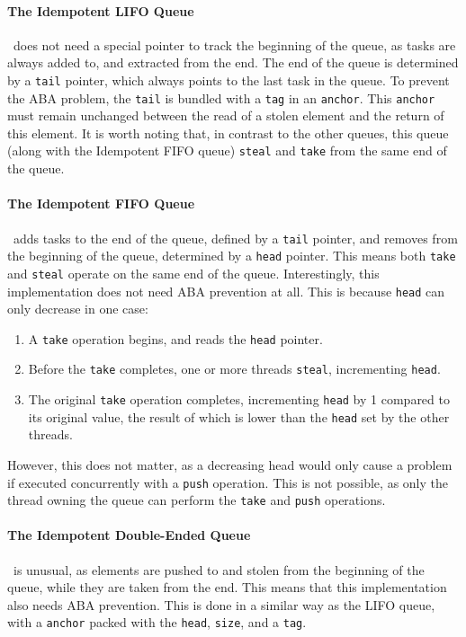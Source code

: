 \paragraph{The Idempotent LIFO Queue}\,\cite{Michael:2009:IWS:1594835.1504186} does not need a special pointer to track the beginning of the queue, as tasks are always added to, and extracted from the end.
The end of the queue is determined by a \texttt{tail} pointer, which always points to the last task in the queue.
To prevent the ABA problem, the \texttt{tail} is bundled with a \texttt{tag} in an \texttt{anchor}.
This \texttt{anchor} must remain unchanged between the read of a stolen element and the return of this element.
It is worth noting that, in contrast to the other queues, this queue (along with the Idempotent FIFO queue) \texttt{steal} and \texttt{take} from the same end of the queue.

\paragraph{The Idempotent FIFO Queue}\,\cite{Michael:2009:IWS:1594835.1504186} adds tasks to the end of the queue, defined by a \texttt{tail} pointer, and removes from the beginning of the queue, determined by a \texttt{head} pointer.
This means both \texttt{take} and \texttt{steal} operate on the same end of the queue.
Interestingly, this implementation does not need ABA prevention at all.
This is because \texttt{head} can only decrease in one case:
\begin{enumerate}
  \item A \texttt{take} operation begins, and reads the \texttt{head} pointer.
  \item Before the \texttt{take} completes, one or more threads \texttt{steal}, incrementing \texttt{head}.
  \item The original \texttt{take} operation completes, incrementing \texttt{head} by 1 compared to its original value, the result of which is lower than the \texttt{head} set by the other threads.
\end{enumerate}
However, this does not matter, as a decreasing head would only cause a problem if executed concurrently with a \texttt{push} operation.
This is not possible, as only the thread owning the queue can perform the \texttt{take} and \texttt{push} operations.

\paragraph{The Idempotent Double-Ended Queue}\,\cite{Michael:2009:IWS:1594835.1504186} is unusual, as elements are pushed to and stolen from the beginning of the queue, while they are taken from the end. 
This means that this implementation also needs ABA prevention.
This is done in a similar way as the LIFO queue, with a \texttt{anchor} packed with the \texttt{head}, \texttt{size}, and a \texttt{tag}.

